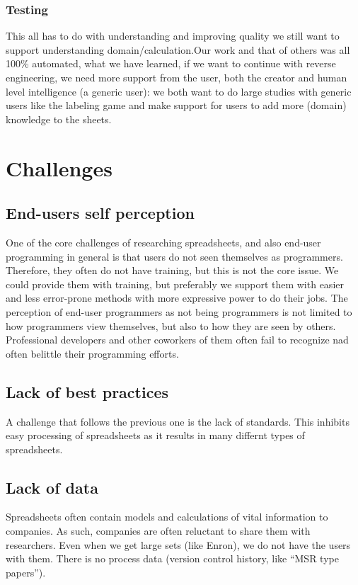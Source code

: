 \documentclass[conference]{IEEEtran}
\begin{document}
\subsubsection{Testing}


This all has to do with understanding and improving quality we still want to support understanding domain/calculation.Our work and that of others was all 100\% automated, what we have learned, if we want to continue with reverse engineering, we need more support from the user, both the creator and human level intelligence (a generic user): we both want to do large studies with generic users like the labeling game and make support for users to add more (domain) knowledge to the sheets.

\section{Challenges} 

\subsection{End-users self perception}
One of the core challenges of researching spreadsheets, and also end-user programming in general is that users do not seen themselves as programmers. Therefore, they often do not have training, but this is not the core issue. We could provide them with training, but preferably we support them with easier and less error-prone methods with more expressive power to do their jobs.
The perception of end-user programmers as not being programmers is not limited to how programmers view themselves, but also to how they are seen by others. Professional developers and other coworkers of them often fail to recognize nad often belittle their programming efforts.

\subsection{Lack of best practices}
A challenge that follows the previous one is the lack of standards. This inhibits easy processing of spreadsheets as it results in many differnt types of spreadsheets.

\subsection{Lack of data}
Spreadsheets often contain models and calculations of vital information to companies. As such, companies are often reluctant to share them with researchers.  Even when we get large sets (like Enron), we do not have the users with them. There is no process data (version control history, like “MSR type papers”).
\end{document}
